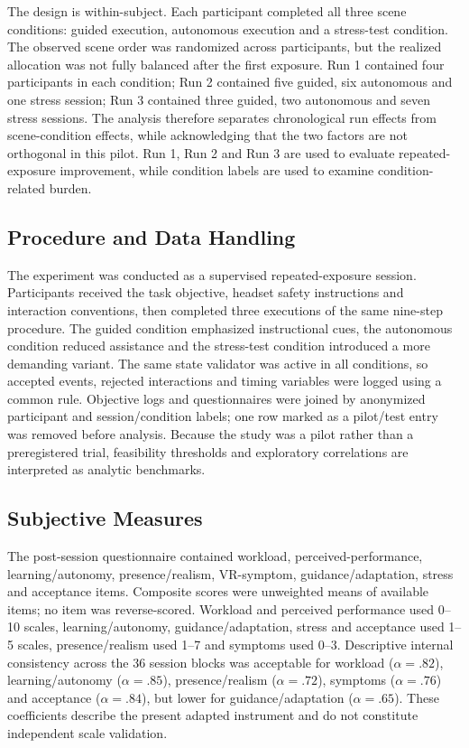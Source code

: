 \documentclass[a4paper,twoside]{article}
\begin{document}
The design is within-subject. Each participant completed all three scene conditions: guided execution, autonomous execution and a stress-test condition. The observed scene order was randomized across participants, but the realized allocation was not fully balanced after the first exposure. Run 1 contained four participants in each condition; Run 2 contained five guided, six autonomous and one stress session; Run 3 contained three guided, two autonomous and seven stress sessions. The analysis therefore separates chronological run effects from scene-condition effects, while acknowledging that the two factors are not orthogonal in this pilot. Run 1, Run 2 and Run 3 are used to evaluate repeated-exposure improvement, while condition labels are used to examine condition-related burden.

\subsection{Procedure and Data Handling}

The experiment was conducted as a supervised repeated-exposure session. Participants received the task objective, headset safety instructions and interaction conventions, then completed three executions of the same nine-step procedure. The guided condition emphasized instructional cues, the autonomous condition reduced assistance and the stress-test condition introduced a more demanding variant. The same state validator was active in all conditions, so accepted events, rejected interactions and timing variables were logged using a common rule. Objective logs and questionnaires were joined by anonymized participant and session/condition labels; one row marked as a pilot/test entry was removed before analysis. Because the study was a pilot rather than a preregistered trial, feasibility thresholds and exploratory correlations are interpreted as analytic benchmarks.

\subsection{Subjective Measures}

The post-session questionnaire contained workload, perceived-performance, learning/autonomy, presence/realism, VR-symptom, guidance/adaptation, stress and acceptance items. Composite scores were unweighted means of available items; no item was reverse-scored. Workload and perceived performance used 0--10 scales, learning/autonomy, guidance/adaptation, stress and acceptance used 1--5 scales, presence/realism used 1--7 and symptoms used 0--3. Descriptive internal consistency across the 36 session blocks was acceptable for workload ($\alpha=.82$), learning/autonomy ($\alpha=.85$), presence/realism ($\alpha=.72$), symptoms ($\alpha=.76$) and acceptance ($\alpha=.84$), but lower for guidance/adaptation ($\alpha=.65$). These coefficients describe the present adapted instrument and do not constitute independent scale validation.
\end{document}
